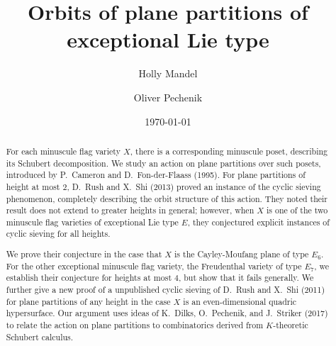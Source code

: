 \documentclass[12pt]{amsart}
\theoremstyle{definition}
\theoremstyle{remark}
\numberwithin{equation}{section}
\begin{document}

\title[Orbits of plane partitions]{Orbits of plane partitions of exceptional Lie type}  

\author[H. Mandel]{Holly Mandel}
\address[HM]{Department of Mathematics, University of California, Berkeley, \linebreak Berkeley, CA 94720}

\author[O. Pechenik]{Oliver Pechenik}
\address[OP]{Department of Mathematics, University of Michigan, Ann Arbor, MI 48109}


\date{\today}




\begin{abstract}
For each minuscule flag variety $X$, there is a corresponding minuscule poset, describing its Schubert decomposition. We study an action on plane partitions over such posets, introduced by P.~Cameron and D.~Fon-der-Flaass (1995).
For plane partitions of height at most $2$, D.~Rush and X.~Shi (2013) proved an instance of the cyclic sieving phenomenon, completely describing the orbit structure of this action. They noted their result does not extend to greater heights in general; however, when $X$ is one of the two minuscule flag varieties of exceptional Lie type $E$, they conjectured explicit instances of cyclic sieving for all heights.

We prove their conjecture in the case that $X$ is the Cayley-Moufang plane of type $E_6$. For the other exceptional minuscule flag variety, the Freudenthal variety of type $E_7$, we establish their conjecture for heights at most $4$, but show that it fails generally. We further give a new proof of a unpublished cyclic sieving of D.~Rush and X.~Shi (2011) for plane partitions of any height in the case $X$ is an even-dimensional quadric hypersurface. 
Our argument uses ideas of K.~Dilks, O.~Pechenik, and J.~Striker (2017) to relate the action on plane partitions to combinatorics derived from $K$-theoretic Schubert calculus. 
\end{abstract}
\end{document}

